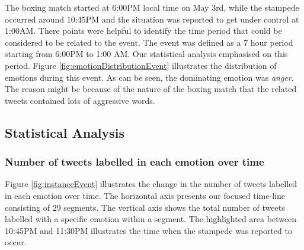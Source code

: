 The boxing match started at 6:00PM local time on May 3rd, while the stampede occurred around 10:45PM and the situation was reported to get under control at 1:00AM. There points were helpful to identify the time period that could be considered to be related to the event. The event was defined as a 7 hour period starting from 6:00PM to 1:00 AM. Our statistical analysis emphasised on this period. Figure \ref{fig:emotionDistributionEvent} illustrates the distribution of emotions during this event. As can be seen, the dominating emotion was \textit{anger}. The reason might be because of the nature of the boxing match that the related tweets contained lots of aggressive words.

\subsection{Statistical Analysis}

\subsubsection{Number of tweets labelled in each emotion over time}
Figure \ref{fig:instanceEvent} illustrates the change in the number of tweets labelled in each emotion over time. The horizontal axis presents our focused time-line consisting of 29 segments. The vertical axis shows the total number of tweets labelled with a specific emotion within a segment. The highlighted area between 10:45PM and 11:30PM illustrates the time when the stampede was reported to occur.

